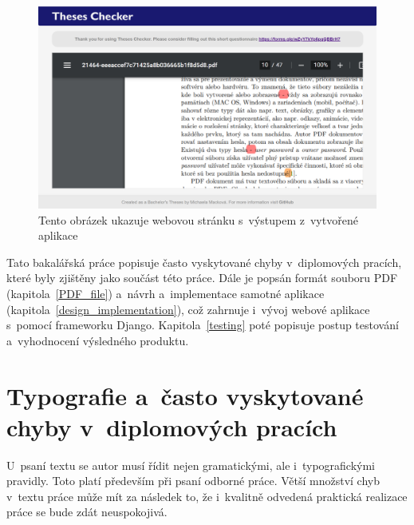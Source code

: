 \begin{figure}[H]
    \centering
    \includegraphics[width=\linewidth]{obrazky-figures/screenshot-page2.png}
    \caption{Tento obrázek ukazuje webovou stránku s~výstupem z~vytvořené aplikace}
    \label{pic_theses_checker_page2}
\end{figure}

Tato bakalářská práce popisuje  často vyskytované chyby
v~diplomových pracích, které byly zjištěny jako součást této práce. Dále je
popsán formát souboru PDF (kapitola~\ref{PDF_file}) a~návrh a~implementace samotné
aplikace (kapitola~\ref{design_implementation}), což zahrnuje i~vývoj webové
aplikace s~pomocí frameworku Django. Kapitola~\ref{testing} poté popisuje postup
testování a~vyhodnocení výsledného produktu.






\chapter{Typografie a~často vyskytované chyby v~diplomových pracích} \label{frequent_mistakes}
U~psaní textu se autor musí řídit nejen gramatickými, ale i~typografickými
pravidly. Toto platí především při psaní odborné práce. Větší množství chyb
v~textu práce může mít za následek to, že i~kvalitně odvedená praktická realizace
práce se bude zdát neuspokojivá.

